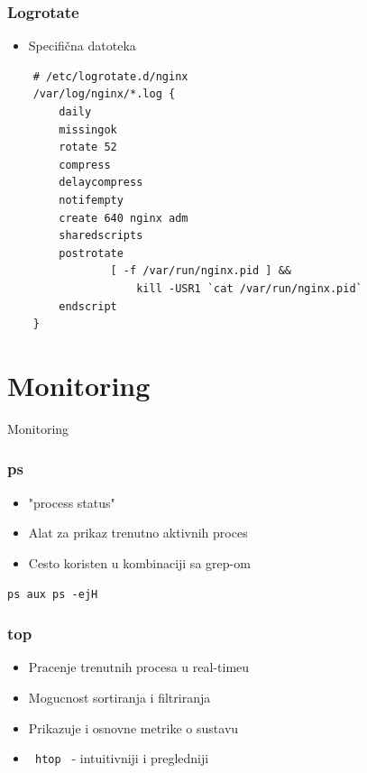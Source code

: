 \documentclass[t,table,usenames,dvipsnames]{beamer}
\newcommand{\shell}[1]{\texttt{#1}}
\begin{document}
\begin{frame}[fragile]
    \frametitle{Logrotate}
    \begin{itemize}
        \item Specifična datoteka
    \end{itemize}
    \begin{verbatim}
    # /etc/logrotate.d/nginx
    /var/log/nginx/*.log {
        daily
        missingok
        rotate 52
        compress
        delaycompress
        notifempty
        create 640 nginx adm
        sharedscripts
        postrotate
                [ -f /var/run/nginx.pid ] && 
                    kill -USR1 `cat /var/run/nginx.pid`
        endscript
    }

    \end{verbatim}

\end{frame}

\section{Monitoring}
\begin{frame}
    \vspace*{\fill}
        \begin{center}
            \Huge{Monitoring}
        \end{center}
    \vspace*{\fill}
\end{frame}


\begin{frame}
	\frametitle{ps}
	
	\begin{itemize}
		\item "process status"
		\item Alat za prikaz trenutno aktivnih proces
		\item Cesto koristen u kombinaciji sa grep-om
	\end{itemize}
		 \shell{ps aux  \newline
				ps -ejH}		
	
		
	
\end{frame}

\begin{frame}
	\frametitle{top}
	
	\begin{itemize}
		\item Pracenje trenutnih procesa u real-timeu
		\item Mogucnost sortiranja i filtriranja
		\item Prikazuje i osnovne metrike o sustavu
		\item \shell{ htop } - intuitivniji i pregledniji
	\end{itemize}
\end{frame}
\end{document}
